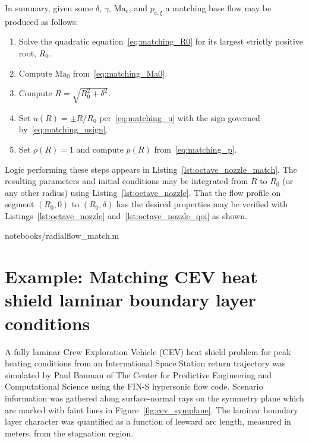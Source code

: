 \documentclass[letterpaper,11pt,nointlimits,reqno]{amsart}
\newcommand{\Mach}[1][]{\mbox{Ma}_{#1}}
\begin{document}
In summary, given some $\delta$, $\gamma$, $\Mach[e]$, and $p_{e,\xi}$ a
matching base flow may be produced as follows:
\begin{enumerate}
    \item Solve the quadratic equation~\eqref{eq:matching_R0} for
          its largest strictly positive root, $R_0$.
    \item Compute $\Mach[0]{}$ from~\eqref{eq:matching_Ma0}.
    \item Compute $R = \sqrt{R_0^2 + \delta^2}$.
    \item Set $u\!\left(R\right)=\pm R / R_0$ per~\eqref{eq:matching_u}
          with the sign governed by~\eqref{eq:matching_usign}.
    \item Set $\rho\!\left(R\right) = 1$ and compute $p\!\left(R\right)$
          from~\eqref{eq:matching_p}.
\end{enumerate}
Logic performing these steps appears in Listing~\ref{lst:octave_nozzle_match}.
The resulting parameters and initial conditions may be integrated from $R$ to
$R_0$ (or any other radius) using Listing~\ref{lst:octave_nozzle}. That the flow
profile on segment $\left( R_0, 0 \right)$ to $\left( R_0, \delta \right)$ has
the desired properties may be verified with Listings~\ref{lst:octave_nozzle}
and~\ref{lst:octave_nozzle_qoi} as shown.


                {notebooks/radialflow_match.m}

\section{Example: Matching CEV heat shield laminar boundary layer conditions}

A fully laminar Crew Exploration Vehicle (CEV) heat shield problem for peak
heating conditions from an International Space Station return trajectory was
simulated by Paul Bauman of The Center for Predictive Engineering and
Computational Science using the FIN-S hypersonic flow
code\citep{KirkModeling2013}.  Scenario information was gathered along
surface-normal rays on the symmetry plane which are marked with faint lines in
Figure~\ref{fig:cev_symplane}.  The laminar boundary layer character was
quantified as a function of leeward arc length, measured in meters, from the
stagnation region.
\end{document}
